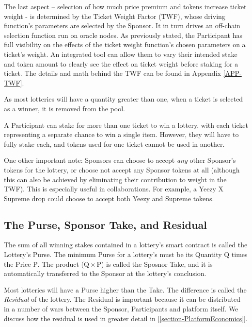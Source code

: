 \documentclass[runningheads]{llncs}
\begin{document}
The last aspect – selection of how much price premium and tokens increase ticket weight - is determined by the Ticket Weight Factor (TWF), whose driving function’s parameters are selected by the Sponsor.  It in turn drives an off-chain selection function run on oracle nodes.  As previously stated, the Participant has full visibility on the effects of the ticket weight function’s chosen parameters on a ticket’s weight.  An integrated tool can allow them to vary their intended stake and token amount to clearly see the effect on ticket weight before staking for a ticket.  The details and math behind the TWF can be found in Appendix \ref{APP-TWF}.

As most lotteries will have a quantity greater than one, when a ticket is selected as a winner, it is removed from the pool.

A Participant can stake for more than one ticket to win a lottery, with each ticket representing a separate chance to win a single item.  However, they will have to fully stake each, and tokens used for one ticket cannot be used in another.

One other important note: Sponsors can choose to accept \emph{any} other Sponsor’s tokens for the lottery, or choose not accept any Sponsor tokens at all (although this can also be achieved by eliminating their contribution to weight in the TWF).  This is especially useful in collaborations.  For example, a Yeezy X Supreme drop could choose to accept both Yeezy and Supreme tokens.

\subsection{The Purse, Sponsor Take, and Residual}\label{subsection-ThePurseLotteryValuedStaked}
The sum of all winning stakes contained in a lottery’s smart contract is called the Lottery’s Purse.  The minimum Purse for a lottery’s must be its Quantity $\mathrm{Q}$ times the Price $\mathrm{P}$.  The product ($\mathrm{Q} \times \mathrm{P}$) is called the Sposnor Take, and it is automatically transferred to the Sponsor at the lottery’s conclusion.

Most lotteries will have a Purse higher than the Take.  The difference is called the \emph{Residual} of the lottery.  The Residual is important because it can be distributed in a number of wars between the Sponsor, Participants and platform itself.  We discuss how the residual is used in greater detail in [\ref{section-PlatformEconomics}].
\end{document}
